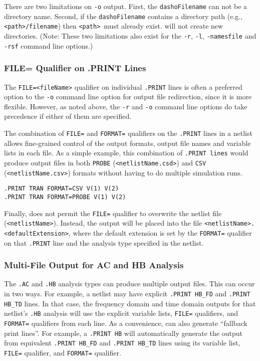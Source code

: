 {{There are two limitations on \verb+-o+ output.  First, the \verb+dashoFilename+
can not be a directory name.  Second, if the \verb+dashoFilename+ contains a
directory path (e.g., \verb+<path>/filename+) then \verb+<path>+\ must already exist.
\Xyce{} will not create new directories.  (Note: These two limitations also exist
for the \verb+-r+, \verb+-l+, \verb+-namesfile+ and \verb+-rsf+ command line
options.)

\subsubsection{FILE= Qualifier on .PRINT Lines}
The \texttt{FILE=<fileName>} qualifier on individual \texttt{.PRINT} lines is
often a preferred option to the \verb+-o+ command line option for output file 
redirection, since it is more flexible.  However, as noted above, the \verb+-r+
 and \verb+-o+ command line options do take precedence if either of them are 
specified.

The combination of \texttt{FILE=} and \texttt{FORMAT=} qualifiers on the 
\texttt{.PRINT} lines in a netlist allows fine-grained control of the 
output formats, output file names and variable lists in each file.  As a 
simple example, this combination of \texttt{.PRINT lines} would produce output
files in both \texttt{PROBE} (\verb+<netlistName.csd>+) and \texttt{CSV}
(\verb+<netlistName.csv>+) formats without having to do multiple simulation runs.

\begin{verbatim}
.PRINT TRAN FORMAT=CSV V(1) V(2)
.PRINT TRAN FORMAT=PROBE V(1) V(2) 
\end{verbatim}

Finally, \Xyce{} does not permit the \texttt{FILE=} qualifier to overwrite the 
netlist file (\verb+<netlistName>+).  Instead, the output will be placed into 
the file \verb+<netlistName>.<defaultExtension>+, where the default extension
is set by  the \texttt{FORMAT=} qualifier on that \texttt{.PRINT} line and the 
analysis type specified in the netlist.

\subsubsection{Multi-File Output for AC and HB Analysis}
The {\tt .AC} and {\tt .HB} analysis types can produce multiple output files.
This can occur in two ways.  For example, a netlist may have explicit
\texttt{.PRINT HB\_FD} and \texttt{.PRINT HB\_TD} lines.  In that case, the
frequency domain and time domain outputs for that netlist's {\tt .HB} analysis 
will use the explicit variable lists, \texttt{FILE=} qualifiers, and \texttt{FORMAT=} 
qualifiers from each line.  As a convenience, \Xyce{} can also generate
``fallback print lines''.  For example, a \texttt{.PRINT HB} will 
automatically generate the output from equivalent \texttt{.PRINT HB\_FD} 
and \texttt{.PRINT HB\_TD} lines using its variable list, \texttt{FILE=} qualifier, 
and \texttt{FORMAT=} qualifier.  

}}
